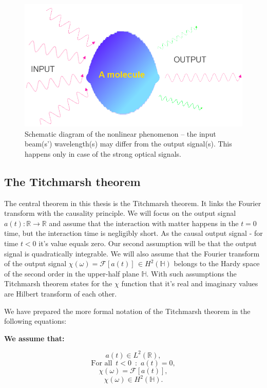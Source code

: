 \documentclass[12pt,twoside,a4paper]{article}
\numberwithin{equation}{subsection}
\numberwithin{figure}{subsection}
\begin{document}
\begin{figure} 
  \includegraphics[width=150mm]{img/opt_phenom3.png}
  \caption{Schematic diagram of the nonlinear phenomenon -- the input beam(s') wavelength(s) may differ from the output signal(s).
  This happens only in case of the strong optical signals.
  \label{fig:mathematical_inoutput}}
\end{figure}

\subsection{The Titchmarsh theorem}

The central theorem in this thesis is the Titchmarsh theorem. It links the Fourier transform with the causality principle. We will focus on
the output signal $ a(t) : \mathbb{R} \to \mathbb{R} $ and assume that the interaction with matter happens in the $ t = 0 $ time, but the
interaction time is negligibly short. As the causal output signal - for time $ t < 0 $ it's value equals zero. Our second assumption will be
that the output signal is quadratically integrable. We will also assume that the Fourier transform of the output signal $ \chi(\omega) =
\mathcal{F}[a(t)] \, \in H^2 (\mathbb{H}) $ belongs to the Hardy space of the second order in the upper-half plane $ \mathbb{H} $. With such
assumptions the Titchmarsh theorem states for the $ \chi $ function that it's real and imaginary values are Hilbert transform of each other.

We have prepared the more formal notation of the Titchmarsh theorem in the following equations:

\textbf{We assume that:}
 
\begin{equation} \label{eq:mathematical_l2output}
  a(t) \in L^{2} (\mathbb{R}),
\end{equation}
\begin{equation} \label{eq:mathematical_faoutput}
  \text{For all } \, t < 0 \, \text{ : } \, a (t) = 0,
\end{equation}
\begin{equation} \label{eq:mathematical_ttisfourier}
  \chi(\omega) = \mathcal{F}[a(t)],
\end{equation}
\begin{equation} \label{eq:mathematical_tth2fourier}
  \chi(\omega) \in H^2(\mathbb{H}).
\end{equation}
\end{document}
